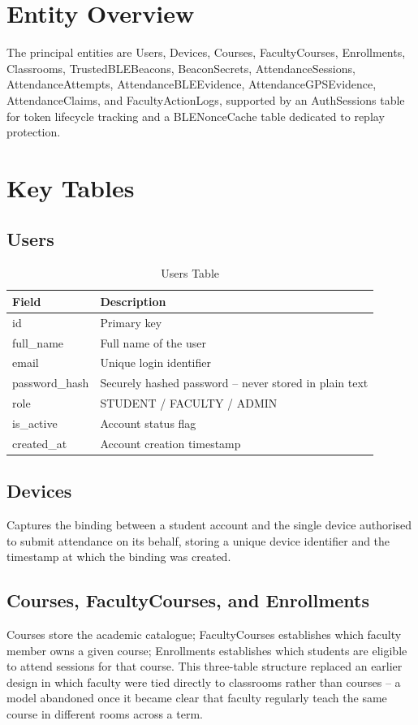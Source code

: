 \documentclass[12pt, a4paper, oneside]{report}
\begin{document}
\section{Entity Overview}

The principal entities are Users, Devices, Courses, FacultyCourses, Enrollments, Classrooms, TrustedBLEBeacons, BeaconSecrets, AttendanceSessions, AttendanceAttempts, AttendanceBLEEvidence, AttendanceGPSEvidence, AttendanceClaims, and FacultyActionLogs, supported by an AuthSessions table for token lifecycle tracking and a BLENonceCache table dedicated to replay protection.

\section{Key Tables}

\subsection{Users}

\begin{table}[htbp]
\centering
\caption{Users Table}
\label{tab:users-table}
\begin{tabularx}{\textwidth}{|l|X|}
\hline
\textbf{Field} & \textbf{Description} \\
\hline
id & Primary key \\
\hline
full\_name & Full name of the user \\
\hline
email & Unique login identifier \\
\hline
password\_hash & Securely hashed password -- never stored in plain text \\
\hline
role & STUDENT / FACULTY / ADMIN \\
\hline
is\_active & Account status flag \\
\hline
created\_at & Account creation timestamp \\
\hline
\end{tabularx}
\end{table}

\subsection{Devices}
Captures the binding between a student account and the single device authorised to submit attendance on its behalf, storing a unique device identifier and the timestamp at which the binding was created.

\subsection{Courses, FacultyCourses, and Enrollments}
Courses store the academic catalogue; FacultyCourses establishes which faculty member owns a given course; Enrollments establishes which students are eligible to attend sessions for that course. This three-table structure replaced an earlier design in which faculty were tied directly to classrooms rather than courses -- a model abandoned once it became clear that faculty regularly teach the same course in different rooms across a term.
\end{document}
